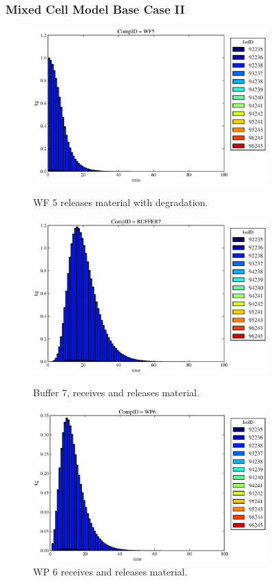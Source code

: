 \begin{frame}[ctb!]
  \frametitle{Mixed Cell Model Base Case II}
  \begin{figure}
\begin{minipage}[b]{0.45\linewidth}

  \includegraphics[width=0.8\textwidth]{./images/mcIII1.eps}
  \caption[MCI WF Contaminants.]{
    WF 5 releases material with degradation. 
    }
  \label{fig:mcIIIwf5}
  
  \includegraphics[width=0.8\textwidth]{./images/mcIII3.eps}
  \caption[Case MCI Buffer Contaminants]{
    Buffer 7, receives and releases material.
    }
  \label{fig:mcIIIbuff}

\end{minipage}
\hspace{0.05\linewidth}
\begin{minipage}[b]{0.45\linewidth}
  \includegraphics[width=0.8\textwidth]{./images/mcIII2.eps}
  \caption[Case MCI WP Contaminants.]{ 
    WP 6 receives and releases material. 
    }
  \label{fig:mcIIIwp6}


\end{minipage}
\end{figure}
\end{frame}
